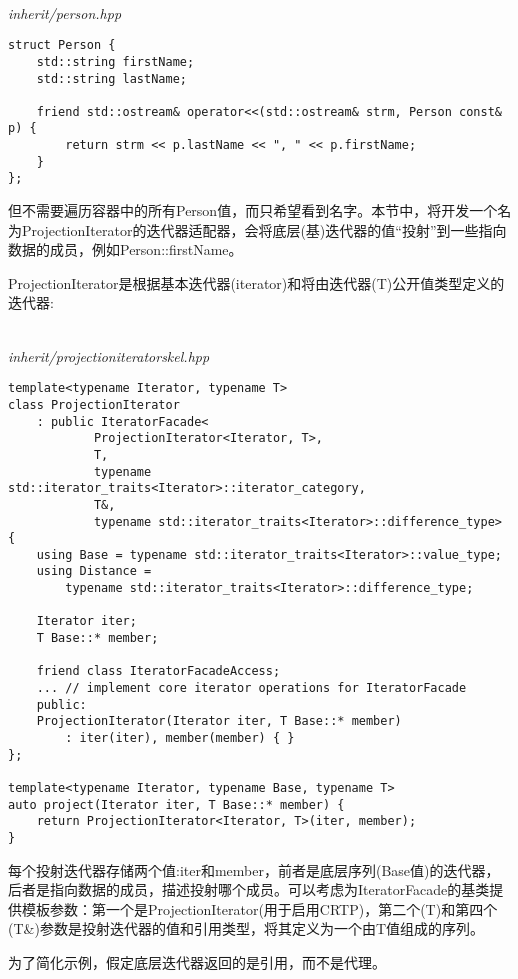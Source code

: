 \hspace*{\fill} \\ %
\noindent
\textit{inherit/person.hpp}
\begin{lstlisting}[style=styleCXX]
struct Person {
	std::string firstName;
	std::string lastName;
	
	friend std::ostream& operator<<(std::ostream& strm, Person const& p) {
		return strm << p.lastName << ", " << p.firstName;
	}
};
\end{lstlisting}

但不需要遍历容器中的所有Person值，而只希望看到名字。本节中，将开发一个名为ProjectionIterator的迭代器适配器，会将底层(基)迭代器的值“投射”到一些指向数据的成员，例如Person::firstName。

ProjectionIterator是根据基本迭代器(iterator)和将由迭代器(T)公开值类型定义的迭代器:

\hspace*{\fill} \\ %
\noindent
\textit{inherit/projectioniteratorskel.hpp}
\begin{lstlisting}[style=styleCXX]
template<typename Iterator, typename T>
class ProjectionIterator
	: public IteratorFacade<
			ProjectionIterator<Iterator, T>,
			T,
			typename std::iterator_traits<Iterator>::iterator_category,
			T&,
			typename std::iterator_traits<Iterator>::difference_type>
{
	using Base = typename std::iterator_traits<Iterator>::value_type;
	using Distance =
		typename std::iterator_traits<Iterator>::difference_type;
	
	Iterator iter;
	T Base::* member;
	
	friend class IteratorFacadeAccess;
	... // implement core iterator operations for IteratorFacade
	public:
	ProjectionIterator(Iterator iter, T Base::* member)
		: iter(iter), member(member) { }
};

template<typename Iterator, typename Base, typename T>
auto project(Iterator iter, T Base::* member) {
	return ProjectionIterator<Iterator, T>(iter, member);
}
\end{lstlisting}

每个投射迭代器存储两个值:iter和member，前者是底层序列(Base值)的迭代器，后者是指向数据的成员，描述投射哪个成员。可以考虑为IteratorFacade的基类提供模板参数：第一个是ProjectionIterator(用于启用CRTP)，第二个(T)和第四个(T\&)参数是投射迭代器的值和引用类型，将其定义为一个由T值组成的序列。

\begin{tcolorbox}[colback=webgreen!5!white,colframe=webgreen!75!black]
\hspace*{0.75cm}为了简化示例，假定底层迭代器返回的是引用，而不是代理。
\end{tcolorbox}


